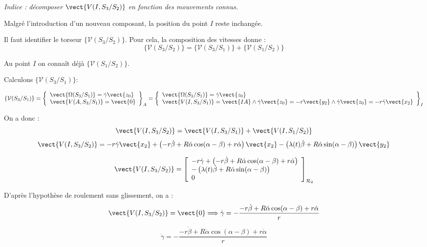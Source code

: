\textit{Indice : décomposer $\vect{V(I,S_3/S_2)}$ en fonction des mouvements connus.}
\ifprof%
\begin{corrige}

Malgré l'introduction d'un nouveau composant, la position du point $I$ reste inchangée.

Il faut identifier le torseur $\{\mathcal{V}(S_3/S_2)\}$. 
Pour cela, la composition des vitesses donne :
$$
\{\mathcal{V}(S_3/S_2)\} = \{\mathcal{V}(S_3/S_1)\} + \{\mathcal{V}(S_1/S_2)\}  
$$


Au point $I$ on connaît déjà $\{\mathcal{V}(S_1/S_2)\}$.

Calculons $\{\mathcal{V}(S_3/S_1)\}$:

$$
\{\mathcal{V}(S_3/S_1)\}
= 
\left\{
\begin{array}{l}
\vect{\Omega(S_3/S_1)} = \dot{\gamma}\vect{z_0} \\
\vect{V(A,S_3/S_1)} = \vect{0}
\end{array}
\right\}_A =
\left\{
\begin{array}{l}
\vect{\Omega(S_3/S_1)} = \dot{\gamma}\vect{z_0} \\
\vect{V(I,S_3/S_1)} = \vect{IA} \wedge \dot{\gamma}\vect{z_0}
= -r\vect{y_2} \wedge \dot{\gamma}\vect{z_0} = -r \dot{\gamma}\vect{x_2}
\end{array}
\right\}_I
$$

On a donc :
$$
\vect{V(I,S_3/S_2)} = \vect{V(I,S_3/S_1)} + \vect{V(I,S_1/S_2)} 
$$
$$
\vect{V(I,S_3/S_2)} = -r \dot{\gamma}\vect{x_2} 
+\left(-r\dot{\beta}+ R\dot{\alpha}\cos(\alpha-\beta) + r\dot{\alpha}\right)\vect{x_2}
- \left(\lambda(t) \dot{\beta}+  R\dot{\alpha}\sin(\alpha-\beta)\right)\vect{y_2}
$$


$$
\vect{V(I,S_3/S_2)} =\left[ 
\begin{array}{l}
 -r \dot{\gamma}+\left(-r\dot{\beta}+ R\dot{\alpha}\cos(\alpha-\beta) + r\dot{\alpha}\right)\\
- \left(\lambda(t) \dot{\beta}+  R\dot{\alpha}\sin(\alpha-\beta)\right)\\
0\\
\end{array}
\right]_{\mathcal{R}_2}  
$$



D'après l'hypothèse de roulement sans glissement, on a :
$$ 
\vect{V(I,S_3/S_2)} = \vect{0} \Longrightarrow  \dot{\gamma}=-\dfrac{-r\dot{\beta}+ R\dot{\alpha}\cos(\alpha-\beta) + r\dot{\alpha}}{r}
$$

\end{corrige}
\else \fi

\ifprof%
\begin{corrige}

$$
 \dot{\gamma}=-\dfrac{-r\dot{\beta}+ R\dot{\alpha}\cos(\alpha-\beta) + r\dot{\alpha}}{r}
$$
\end{corrige}\else\fi



